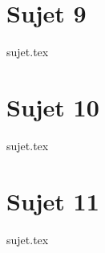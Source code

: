\documentclass[a4paper, 11pt]{book}
\begin{document}
\resetQ
\chapter{Sujet 9}
{sujet.tex}


\resetQ
\chapter{Sujet 10}
{sujet.tex}


\resetQ
\chapter{Sujet 11}
{sujet.tex}
\end{document}
